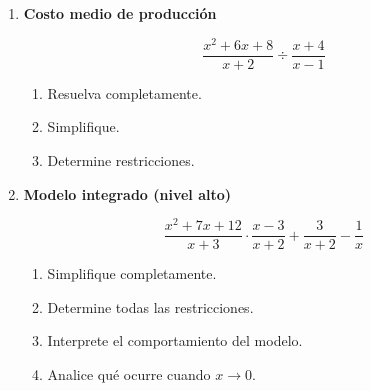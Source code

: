 \documentclass[11pt]{article}
\begin{document}
\begin{enumerate}
				\item \textbf{Costo medio de producción}
				
				\[
				\frac{x^2+6x+8}{x+2}\div\frac{x+4}{x-1}
				\]
				
				\begin{enumerate}[label=\alph*)]
					\item Resuelva completamente.
					\item Simplifique.
					\item Determine restricciones.
				\end{enumerate}
				
				\item \textbf{Modelo integrado (nivel alto)}
				
				\[
				\frac{x^2+7x+12}{x+3}\cdot\frac{x-3}{x+2}+\frac{3}{x+2}-\frac{1}{x}
				\]
				
				\begin{enumerate}[label=\alph*)]
					\item Simplifique completamente.
					\item Determine todas las restricciones.
					\item Interprete el comportamiento del modelo.
					\item Analice qué ocurre cuando \(x\to 0\).
				\end{enumerate}
				
			\end{enumerate}
			
\end{document}
